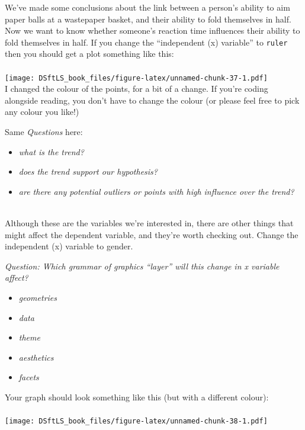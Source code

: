 \documentclass[
]{book}
\providecommand{\tightlist}{%
  \setlength{\itemsep}{0pt}\setlength{\parskip}{0pt}}
\begin{document}
We've made some conclusions about the link between a person's ability to
aim paper balls at a wastepaper basket, and their ability to fold themselves in half.
Now we want to know whether someone's reaction time influences their ability
to fold themselves in half. If you change the ``independent (x) variable'' to
\texttt{ruler} then you should get a plot something like this:\\
~\\
\texttt{[image: DSftLS\_book\_files/figure-latex/unnamed-chunk-37-1.pdf]}\\

I changed the colour of the points, for a bit of a change. If you're coding
alongside reading, you don't have to change the colour
(or please feel free to pick any colour you like!)

Same \emph{Questions} here:

\begin{itemize}
\tightlist
\item
  \emph{what is the trend?}
\item
  \emph{does the trend support our hypothesis?}
\item
  \emph{are there any potential outliers or points with high influence over the trend?}\\
  ~\\
\end{itemize}

Although these are the variables we're interested in, there are other things that
might affect the dependent variable, and they're worth checking out. Change the
independent (x) variable to gender.

\emph{Question: Which grammar of graphics ``layer'' will this change in x variable affect?}

\begin{itemize}
\tightlist
\item
  \emph{geometries}
\item
  \emph{data}
\item
  \emph{theme}
\item
  \emph{aesthetics}
\item
  \emph{facets}\\
\end{itemize}

Your graph should look something like this (but with a different colour):\\
~\\
\texttt{[image: DSftLS\_book\_files/figure-latex/unnamed-chunk-38-1.pdf]}\\
\end{document}

